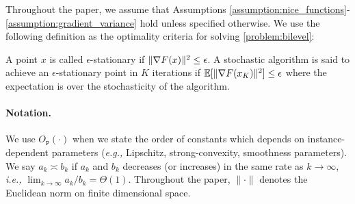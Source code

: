 Throughout the paper, we assume that Assumptions \ref{assumption:nice_functions}-\ref{assumption:gradient_variance} hold unless specified otherwise. We use the following definition as the optimality criteria for solving \eqref{problem:bilevel}:
\begin{definition}
    A point $x$ is called $\epsilon$-stationary if $\|\nabla F(x)\|^2 \le \epsilon$. A stochastic algorithm is said to achieve an $\epsilon$-stationary point in $K$ iterations if $\mathbb{E}[\|\nabla F(x_K)\|^2]\le \epsilon$ where the expectation is over the stochasticity of the algorithm.
\end{definition}






\paragraph{Notation.} We use $O_{\texttt{P}} (\cdot)$ when we state the order of constants which depends on instance-dependent parameters ({\it e.g.,} Lipschitz, strong-convexity, smoothness parameters). We say $a_k \asymp b_k$ if $a_k$ and $b_k$ decreases (or increases) in the same rate as $k \rightarrow \infty$, {\it i.e.,} $\lim_{k\rightarrow \infty} a_k/b_k = \Theta(1)$. Throughout the paper, $\|\cdot\|$ denotes the Euclidean norm on finite dimensional space. 